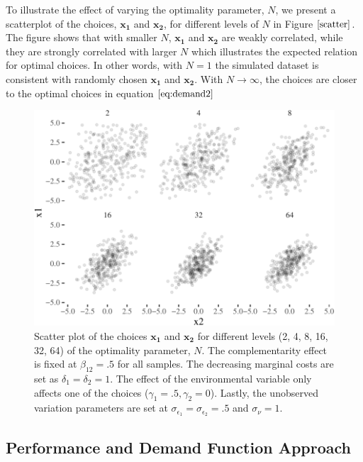 \documentclass[12pt]{article}
\begin{document}
To illustrate the effect of varying the optimality parameter, \(N\), we
present a scatterplot of the choices, \(\mathbf{x_1}\) and
\(\mathbf{x_2}\), for different levels of \(N\) in Figure
\(\ref{scatter}\). The figure shows that with smaller \(N\),
\(\mathbf{x_1}\) and \(\mathbf{x_2}\) are weakly correlated, while they
are strongly correlated with larger \(N\) which illustrates the expected
relation for optimal choices. In other words, with \(N=1\) the simulated
dataset is consistent with randomly chosen \(\mathbf{x_1}\) and
\(\mathbf{x_2}\). With \(N \to \infty\), the choices are closer to the
optimal choices in equation \(\eqref{eq:demand2}\)

\begin{figure}

\includegraphics[width=500px]{figure-latex/scatter-1}
\caption[Distribution of Choices for Different Levels of
Optimality]{\label{scatter} Scatter plot of the choices $\mathbf{x_1}$ and
$\mathbf{x_2}$ for different levels (2, 4, 8, 16, 32, 64) of the optimality
parameter, $N$. The complementarity effect is fixed at $\beta_{12} = .5$ for all
samples. The decreasing marginal costs are set as $\delta_1 = \delta_2 = 1$. The
effect of the environmental variable only affects one of the choices
($\gamma_1 = .5, \gamma_2 = 0$). Lastly, the unobserved variation parameters are
set at $\sigma_{\epsilon_1} = \sigma_{\epsilon_2} = .5$ and $\sigma_{\nu} = 1.$}
\end{figure}

\subsection{Performance and Demand Function
Approach}\label{performance-and-demand-function-approach}
\end{document}
